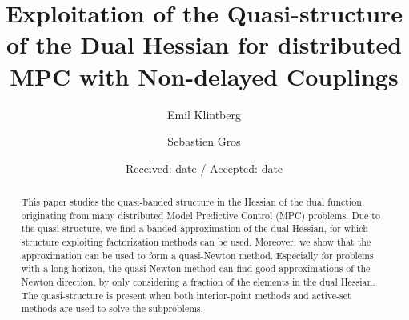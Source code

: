 \title{Exploitation of the Quasi-structure of the Dual Hessian for distributed MPC with Non-delayed Couplings%
}


\author{Emil Klintberg         \and
        Sebastien Gros %
}



\date{Received: date / Accepted: date}


\maketitle

\begin{abstract}
This paper studies the quasi-banded structure in the Hessian of the dual function, originating from many distributed Model Predictive Control (MPC) problems. Due to the quasi-structure, we find a banded approximation of the dual Hessian, for which structure exploiting factorization methods can be used. Moreover, we show that the approximation can be used to form a quasi-Newton method. Especially for problems with a long horizon, the quasi-Newton method can find good approximations of the Newton direction, by only considering a fraction of the elements in the dual Hessian. The quasi-structure is present when both interior-point methods and active-set methods are used to solve the subproblems.

\end{abstract}


